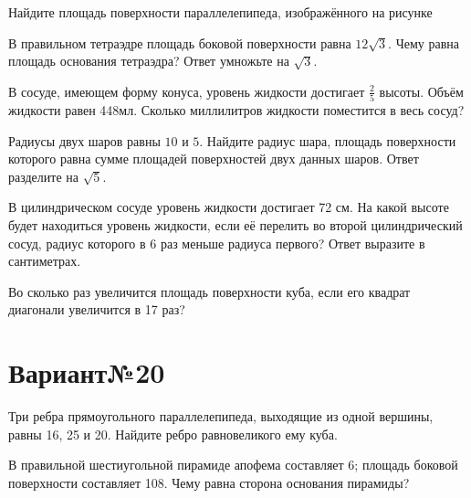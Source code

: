 \documentclass[4apaper]{article}
\begin{document}
\begin{taskBN}{1}
Найдите площадь поверхности параллелепипеда, изображённого на рисунке
\end{taskBN}

\begin{taskBN}{2}
В правильном тетраэдре площадь боковой поверхности равна $12\sqrt{3}$. Чему равна площадь основания тетраэдра? Ответ умножьте на $\sqrt{3}$.
\end{taskBN}

\begin{taskBN}{3}
В сосуде, имеющем форму конуса, уровень жидкости достигает $\frac{2}{5}$ высоты. Объём жидкости равен 448мл. Сколько миллилитров жидкости поместится в весь сосуд?
\end{taskBN}

\begin{taskBN}{4}
Радиусы двух шаров равны $10$ и $5$. Найдите радиус шара, площадь поверхности которого равна сумме площадей поверхностей двух данных шаров. Ответ разделите на $\sqrt{5}$.
\end{taskBN}

\begin{taskBN}{5}
В цилиндрическом сосуде уровень жидкости достигает 72 см. На какой высоте будет находиться уровень жидкости, если её перелить во второй цилиндрический сосуд, радиус которого в 6 раз меньше радиуса первого? Ответ выразите в сантиметрах.
\end{taskBN}

\begin{taskBN}{6}
Во сколько раз увеличится площадь поверхности куба, если его квадрат диагонали увеличится в 17 раз?
\end{taskBN}
\newpage\section*{Вариант№20}

\begin{taskBN}{1}
Три ребра прямоугольного параллелепипеда, выходящие из одной вершины, равны 16, 25 и 20. Найдите ребро равновеликого ему куба.
\end{taskBN}

\begin{taskBN}{2}
В правильной шестиугольной пирамиде апофема составляет 6; площадь боковой поверхности составляет 108. Чему равна сторона основания пирамиды?
\end{taskBN}
\end{document}

